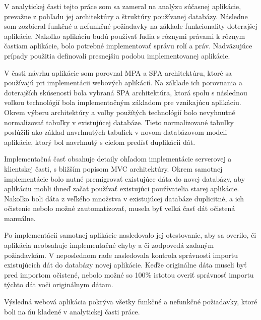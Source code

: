 \begin{conclusion}
V analytickej časti tejto práce som sa zameral na analýzu súčasnej aplikácie, prevažne z pohľadu jej architektúry a štruktúry používanej databázy. Následne som zozbieral funkčné a nefunkčné požiadavky na základe funkcionality doterajšej aplikácie. Nakoľko aplikáciu budú používať ľudia s rôznymi právami k rôznym častiam aplikácie, bolo potrebné implementovať správu rolí a práv. Nadväzujúce prípady použitia definovali presnejšiu podobu implementovanej aplikácie.

V časti návrhu aplikácie som porovnal MPA a SPA architektúru, ktoré sa používajú pri implementácii webových aplikácií. Na základe ich porovnania a doterajších skúseností bola vybraná SPA architektúra, ktorá spolu s následnou voľkou technológií bola implementačným základom pre vznikajúcu aplikáciu. Okrem výberu architektúry a voľby použítých technológií bolo nevyhnutné normalizovať tabuľky v existujúcej databáze. Tieto normalizované tabuľky poslúžili ako základ navrhnutých tabuliek v novom databázovom modeli aplikácie, ktorý bol navrhnutý s cieľom predísť duplikácii dát.

Implementačná časť obsahuje detaily ohľadom implementácie serverovej a klientskej časti, s bližším popisom MVC architektúry.
Okrem samotnej implementácie bolo nutné premigrovať existujúce dáta do novej databázy, aby aplikáciu mohli ihneď začať používať existujúci používatelia starej aplikácie. Nakoľko boli dáta z veľkého množstva v existujúcej databáze duplicitné, a ich očistenie nebolo možné zautomatizovať, musela byť veľká časť dát očistená manuálne.

Po implementácii samotnej aplikácie nasledovalo jej otestovanie, aby sa overilo, či aplikácia neobsahuje implementačné chyby a či zodpovedá zadaným požiadavkám. V neposlednom rade nasledovala kontrola správnosti importu existujúcich dát do databázy novej aplikácie. Keďže originálne dáta museli byť pred importom očistené, nebolo možné so 100\% istotou overiť správnosť importu týchto dát voči originálnym dátam.

Výsledná webová aplikácia pokrýva všetky funkčné a nefunkčné požiadavky, ktoré boli na ňu kladené v analytickej časti práce.
\end{conclusion}